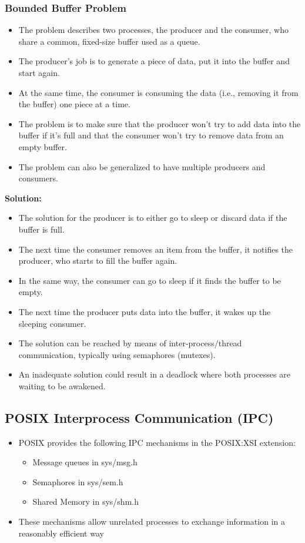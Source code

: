 \subsubsection{Bounded Buffer Problem}
\begin{itemize}
  \item The problem describes two processes, the producer and the consumer, who share a common, fixed-size buffer used as a queue.
  \item The producer's job is to generate a piece of data, put it into the buffer and start again.
  \item At the same time, the consumer is consuming the data (i.e., removing it from the buffer) one piece at a time.
  \item The problem is to make sure that the producer won't try to add data into the buffer if it's full and that the consumer won't try to remove data from an empty buffer.
  \item The problem can also be generalized to have multiple producers and consumers.
\end{itemize}
\textbf{Solution:}
\begin{itemize}
  \item The solution for the producer is to either go to sleep or discard data if the buffer is full.
  \item The next time the consumer removes an item from the buffer, it notifies the producer, who starts to fill the buffer again.
  \item In the same way, the consumer can go to sleep if it finds the buffer to be empty.
  \item The next time the producer puts data into the buffer, it wakes up the sleeping consumer.
  \item The solution can be reached by means of inter-process/thread communication, typically using semaphores (mutexes).
  \item An inadequate solution could result in a deadlock where both processes are waiting to be awakened.
\end{itemize}

\subsection{POSIX Interprocess Communication (IPC)}
\begin{itemize}
  \item POSIX provides the following IPC mechanisms in the POSIX:XSI extension:
  \begin{itemize}
    \item Message queues in sys/msg.h
    \item Semaphores in sys/sem.h
    \item Shared Memory in sys/shm.h
  \end{itemize}
  \item These mechanisms allow unrelated processes to exchange information in a reasonably efficient way
\end{itemize}

